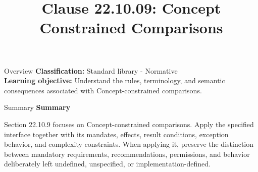\documentclass[10pt,letterpaper]{article}
\title{Clause 22.10.09: Concept Constrained Comparisons}
\author{}
\date{}
\begin{document}
\maketitle
\begin{CornellOverviewBox}{Overview}
\textbf{Classification:} Standard library - Normative\\[2pt]
\textbf{Learning objective:} Understand the rules, terminology, and semantic consequences associated with Concept-constrained comparisons.
\end{CornellOverviewBox}\begin{CornellSummaryBox}{Summary}
{\sffamily\bfseries\color{Accent} Summary}\par\vspace{3pt}Section 22.10.9 focuses on Concept-constrained comparisons. Apply the specified interface together with its mandates, effects, result conditions, exception behavior, and complexity constraints. When applying it, preserve the distinction between mandatory requirements, recommendations, permissions, and behavior deliberately left undefined, unspecified, or implementation-defined.
\end{CornellSummaryBox}
\end{document}
